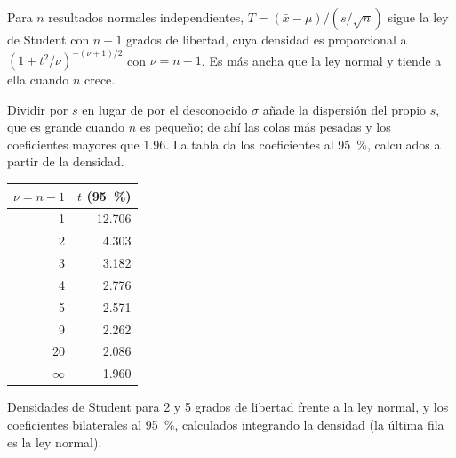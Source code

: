 \begin{proposition}\label{prop:b2:measurement-statistics:student}
Para $n$ resultados normales independientes, $T = (\bar x - \mu)/(s/\sqrt n)$ sigue la ley de Student con
$n - 1$ grados de libertad, cuya densidad es proporcional a $(1 + t^2/\nu)^{-(\nu+1)/2}$ con
$\nu = n - 1$. Es más ancha que la ley normal y tiende a ella cuando $n$ crece.
\end{proposition}

\admitted

Dividir por $s$ en lugar de por el desconocido $\sigma$ añade la dispersión del propio $s$, que es grande cuando $n$ es
pequeño; de ahí las colas más pesadas y los coeficientes mayores que 1.96. La tabla da los coeficientes al 95~\%,
calculados a partir de la densidad.

\begin{omfigure}
\begin{minipage}[c]{0.56\linewidth}
\end{minipage}\hfill
\begin{minipage}[c]{0.4\linewidth}\centering
\small
\begin{tabular}{rr}
\hline
$\nu = n - 1$ & $t$ (95~\%) \\
\hline
1 & 12.706 \\
2 & 4.303 \\
3 & 3.182 \\
4 & 2.776 \\
5 & 2.571 \\
9 & 2.262 \\
20 & 2.086 \\
$\infty$ & 1.960 \\
\hline
\end{tabular}
\end{minipage}
\par\vspace{4pt}

{\small Densidades de Student para 2 y 5 grados de libertad frente a la ley normal, y los coeficientes bilaterales
al 95~\%, calculados integrando la densidad (la última fila es la ley normal).}
\end{omfigure}

